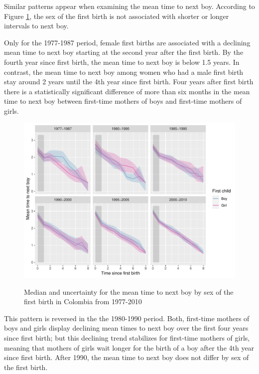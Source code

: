 \documentclass[a4paper,left=1.25cm,right=1.25cm,top=1.25cm,bottom=1.25cm]{article}
\begin{document}
Similar patterns appear when examining the mean time to next boy. According to Figure \ref{fert_02}, the sex of the first birth is not associated with shorter or longer intervals to next boy. 

Only for the 1977-1987 period, female first births are associated with a declining mean time to next boy starting at the second year after the first birth. By the fourth year since first birth, the mean time to next boy is below 1.5 years. In contrast, the mean time to next boy among women who had a male first birth stay around 2 years until the 4th year since first birth. Four years after first birth there is a statistically significant difference of more than six months in the mean time to next boy between first-time mothers of boys and first-time mothers of girls. 

\begin{figure}[H]
\centering
    \includegraphics[scale=0.8]{Figures/colombia/colombia_period_new_2.pdf}\\
    \caption{Median and uncertainty for the mean time to next boy by sex of the first birth in Colombia from 1977-2010}
    \label{fert_02}
\end{figure}

This pattern is reversed in the the 1980-1990 period. Both, first-time mothers of boys and girls display declining mean times to next boy over the first four years since first birth; but this declining trend stabilizes for first-time mothers of girls, meaning that mothers of girls wait longer for the birth of a boy after the 4th year since first birth. After 1990, the mean time to next boy does not differ by sex of the first birth.
\end{document}
